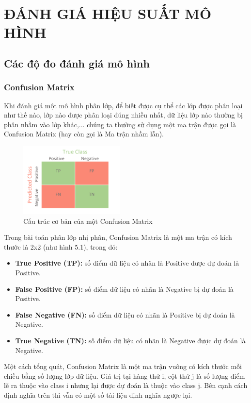 \documentclass[12pt,a4paper,oneside]{book}
\begin{document}
\chapter{ĐÁNH GIÁ HIỆU SUẤT MÔ HÌNH}
	\section{Các độ đo đánh giá mô hình}
	\subsection{Confusion Matrix}
		Khi đánh giá một mô hình phân lớp, để biết được cụ thể các lớp được phân loại như thế nào, lớp nào được phân loại đúng nhiều nhất, dữ liệu lớp nào thường bị phân nhầm vào lớp khác,... chúng ta thường sử dụng một ma trận được gọi là Confusion Matrix (hay còn gọi là Ma trận nhầm lẫn).
		
		\begin{figure}[H]
		\centering
		\includegraphics[width=0.47\textwidth]{confusionmatrix}
		\caption{Cấu trúc cơ bản của một Confusion Matrix}
		\end{figure}
		
		Trong bài toán phân lớp nhị phân, Confusion Matrix là một ma trận có kích thước là 2x2 (như hình 5.1), trong đó:
		\begin{itemize}
		\item \textbf{True Positive (TP):} số điểm dữ liệu có nhãn là Positive được dự đoán là Positive.
		\item \textbf{False Positive (FP):} số điểm dữ liệu có nhãn là Negative bị dự đoán là Positive.
		\item \textbf{False Negative (FN):} số điểm dữ liệu có nhãn là Positive bị dự đoán là Negative.
		\item \textbf{True Negative (TN):} số điểm dữ liệu có nhãn là Negative được dự đoán là Negative.
		\end{itemize}
		
		Một cách tổng quát, Confusion Matrix là một ma trận vuông có kích thước mỗi chiều bằng số lượng lớp dữ liệu. Giá trị tại hàng thứ i, cột thứ j là số lượng điểm lẽ ra thuộc vào class i nhưng lại được dự đoán là thuộc vào class j. Bên cạnh cách định nghĩa trên thì vẫn có một số tài liệu định nghĩa ngược lại.
		
\end{document}
